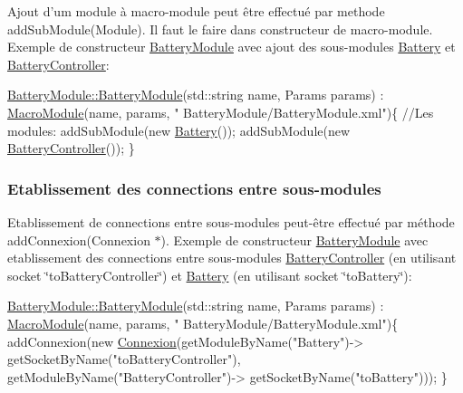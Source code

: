Ajout d'um module à macro-\/module peut être effectué par methode {\ttfamily add\-Sub\-Module(\-Module)}. Il faut le faire dans constructeur de macro-\/module. Exemple de constructeur \hyperlink{classBatteryModule}{Battery\-Module} avec ajout des sous-\/modules \hyperlink{classBattery}{Battery} et \hyperlink{classBatteryController}{Battery\-Controller}\-: 
\begin{DoxyCode}
\hyperlink{classBatteryModule_a2fb494ef5f124c38c0fdf9ccfb31918f}{BatteryModule::BatteryModule}(std::string name, 
      Params params) : \hyperlink{classMacroModule}{MacroModule}(name, params, \textcolor{stringliteral}{"
      BatteryModule/BatteryModule.xml"})\{
    \textcolor{comment}{//Les modules:}
    addSubModule(\textcolor{keyword}{new} \hyperlink{classBattery}{Battery}());
    addSubModule(\textcolor{keyword}{new} \hyperlink{classBatteryController}{BatteryController}());        \}
\end{DoxyCode}
\hypertarget{docMacroModule_connectSubModules}{}\subsubsection{Etablissement des connections entre sous-\/modules}\label{docMacroModule_connectSubModules}
Etablissement de connections entre sous-\/modules peut-\/être effectué par méthode {\ttfamily add\-Connexion(\-Connexion $\ast$)}. Exemple de constructeur \hyperlink{classBatteryModule}{Battery\-Module} avec etablissement des connections entre sous-\/modules \hyperlink{classBatteryController}{Battery\-Controller} (en utilisant socket \char`\"{}to\-Battery\-Controller\char`\"{}) et \hyperlink{classBattery}{Battery} (en utilisant socket \char`\"{}to\-Battery\char`\"{})\-: 
\begin{DoxyCode}
\hyperlink{classBatteryModule_a2fb494ef5f124c38c0fdf9ccfb31918f}{BatteryModule::BatteryModule}(std::string name, 
      Params params) : \hyperlink{classMacroModule}{MacroModule}(name, params, \textcolor{stringliteral}{"
      BatteryModule/BatteryModule.xml"})\{
     addConnexion(\textcolor{keyword}{new} \hyperlink{classConnexion}{Connexion}(getModuleByName(\textcolor{stringliteral}{"Battery"})->
      getSocketByName(\textcolor{stringliteral}{"toBatteryController"}), getModuleByName(\textcolor{stringliteral}{"BatteryController"})->
      getSocketByName(\textcolor{stringliteral}{"toBattery"})));
\}
\end{DoxyCode}
 
